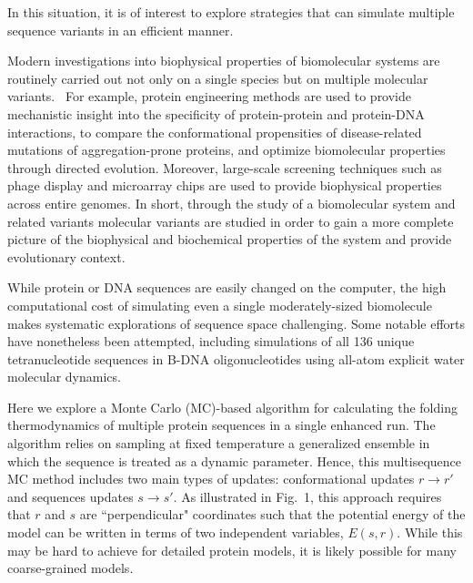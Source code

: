 \documentclass[%
 aip,
rsi,%
 amsmath,amssymb,
 reprint,%
]{revtex4-1}
\newcommand	 {\sbar}	{{s}}
\newcommand	 {\rbar}	{{r}}
\begin{document}
In this situation, it is of interest to explore strategies that can simulate multiple sequence variants in an efficient manner. 

Modern investigations into biophysical properties of biomolecular systems are routinely carried out not only on a single species but on multiple molecular variants.~\cite{Vukmirovic2000,Nickson2010} For example, protein engineering methods are used to provide mechanistic insight into the specificity of protein-protein and protein-DNA interactions, to compare the  conformational propensities of disease-related mutations of aggregation-prone proteins, and optimize biomolecular properties through directed evolution. Moreover, large-scale screening techniques such as phage display and microarray chips are used to provide biophysical properties across entire genomes. In short, through the study of a biomolecular system and related variants molecular variants are studied in order to gain a more complete picture of the biophysical and biochemical properties of the system and provide evolutionary context. 

While protein or DNA sequences are easily changed on the computer, the high computational cost of simulating even a single moderately-sized biomolecule makes systematic explorations of sequence space challenging. Some notable efforts have nonetheless been attempted, including simulations of all 136 unique tetranucleotide sequences in B-DNA oligonucleotides using all-atom explicit water molecular dynamics.~\cite{Beveridge2004}

Here we explore a Monte Carlo (MC)-based algorithm for calculating the folding thermodynamics of multiple protein sequences in a single enhanced run. The algorithm relies on sampling at fixed temperature a generalized ensemble in which the sequence is treated as a dynamic parameter. Hence, this multisequence MC method includes two main types of updates: conformational updates $\rbar\rightarrow\rbar'$ and sequences updates $\sbar\rightarrow\sbar'$. As illustrated in Fig.~1, this approach requires that $\rbar$ and $\sbar$ are ``perpendicular" coordinates such that the potential energy of the model can be written in terms of two independent variables, $E(\sbar,\rbar)$. While this may be hard to achieve for detailed protein models, it is likely possible for many coarse-grained models. 
\end{document}
